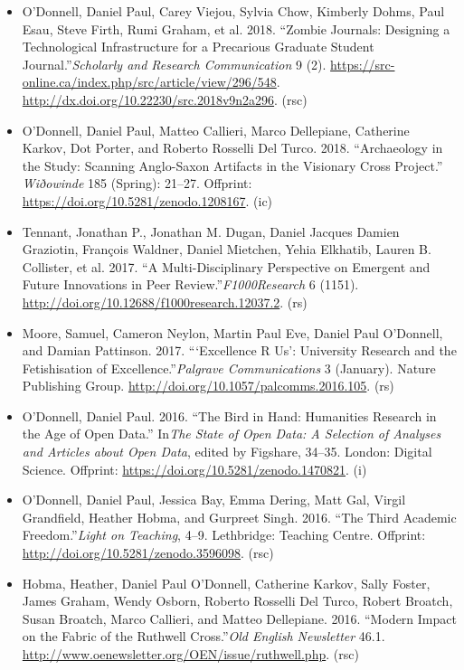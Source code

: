 \documentclass[12pt]{article}
\begin{document}
\begin{itemize}
  \item O’Donnell, Daniel Paul, Carey Viejou\*, Sylvia Chow\*, Kimberly Dohms\*, Paul Esau\*, Steve Firth\*, Rumi Graham, et al. 2018. “Zombie Journals: Designing a Technological Infrastructure for a Precarious Graduate Student Journal.”\textit{Scholarly and Research Communication} 9 (2). \url{https://src-online.ca/index.php/src/article/view/296/548}. \url{http://dx.doi.org/10.22230/src.2018v9n2a296}. (rsc)
  \item O’Donnell, Daniel Paul, Matteo Callieri, Marco Dellepiane, Catherine Karkov, Dot Porter, and Roberto Rosselli Del Turco. 2018. “Archaeology in the Study: Scanning Anglo-Saxon Artifacts in the Visionary Cross Project.” \textit{Wiðowinde} 185 (Spring): 21–27. Offprint: \url{https://doi.org/10.5281/zenodo.1208167}. (ic)
  \item Tennant, Jonathan P., Jonathan M. Dugan, Daniel Jacques Damien Graziotin, François Waldner, Daniel Mietchen, Yehia Elkhatib, Lauren B. Collister, et al. 2017. “A Multi-Disciplinary Perspective on Emergent and Future Innovations in Peer Review.”\textit{F1000Research} 6 (1151). \url{http://doi.org/10.12688/f1000research.12037.2}. (rs)
  \item Moore, Samuel\*, Cameron Neylon, Martin Paul Eve, Daniel Paul O’Donnell, and Damian Pattinson. 2017. “‘Excellence R Us’: University Research and the Fetishisation of Excellence.”\textit{Palgrave Communications} 3 (January). Nature Publishing Group. \url{http://doi.org/10.1057/palcomms.2016.105}. (rs)
  \item O’Donnell, Daniel Paul. 2016. “The Bird in Hand: Humanities Research in the Age of Open Data.” In\textit{The State of Open Data: A Selection of Analyses and Articles about Open Data}, edited by Figshare, 34–35. London: Digital Science. Offprint: \url{https://doi.org/10.5281/zenodo.1470821}. (i)
  \item O’Donnell, Daniel Paul, Jessica Bay\*, Emma Dering\*, Matt Gal\*, Virgil Grandfield\*, Heather Hobma\*, and Gurpreet Singh\*. 2016. “The Third Academic Freedom.”\textit{Light on Teaching}, 4–9. Lethbridge: Teaching Centre. Offprint: \url{http://doi.org/10.5281/zenodo.3596098}. (rsc)
  \item Hobma, Heather\*, Daniel Paul O'Donnell, Catherine Karkov, Sally Foster, James Graham, Wendy Osborn, Roberto Rosselli Del Turco, Robert Broatch, Susan Broatch, Marco Callieri, and Matteo Dellepiane. 2016. “Modern Impact on the Fabric of the Ruthwell Cross.”\textit{Old English Newsletter} 46.1. \url{http://www.oenewsletter.org/OEN/issue/ruthwell.php}. (rsc)

\end{itemize}
\end{document}
